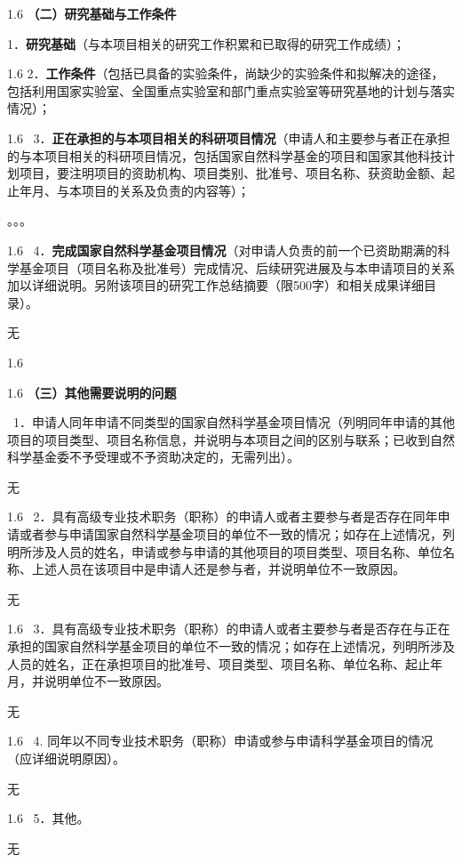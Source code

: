 \documentclass[UTF8,A4]{ctexart}
\newcommand{\blue}{\textcolor[rgb]{0.00,0.44,0.75}}
\begin{document}
\pagebreak[4]
\begin{spacing}{1.6}
\kaishu
\blue{\textbf{（二）研究基础与工作条件}}

\blue{1．\textbf{研究基础}（与本项目相关的研究工作积累和已取得的研究工作成绩）；}
\end{spacing}

\begin{spacing}{1.6}
\kaishu
\blue{2．\textbf{工作条件}（包括已具备的实验条件，尚缺少的实验条件和拟解决的途径，包括利用国家实验室、全国重点实验室和部门重点实验室等研究基地的计划与落实情况）；}
\end{spacing}


\pagebreak[4]
\begin{spacing}{1.6}
\kaishu
\blue{~3．\textbf{正在承担的与本项目相关的科研项目情况}（申请人和主要参与者正在承担的与本项目相关的科研项目情况，包括国家自然科学基金的项目和国家其他科技计划项目，要注明项目的资助机构、项目类别、批准号、项目名称、获资助金额、起止年月、与本项目的关系及负责的内容等）；}
\end{spacing}
。。。

\begin{spacing}{1.6}
\kaishu
\blue{~4．\textbf{完成国家自然科学基金项目情况}（对申请人负责的前一个已资助期满的科学基金项目（项目名称及批准号）完成情况、后续研究进展及与本申请项目的关系加以详细说明。另附该项目的研究工作总结摘要（限500字）和相关成果详细目录）。}
\end{spacing}
无

\begin{spacing}{1.6}
\kaishu

\end{spacing}
\pagebreak[4]
\begin{spacing}{1.6}
\kaishu
\blue{\textbf{（三）其他需要说明的问题}}

\blue{~1．申请人同年申请不同类型的国家自然科学基金项目情况（列明同年申请的其他项目的项目类型、项目名称信息，并说明与本项目之间的区别与联系；已收到自然科学基金委不予受理或不予资助决定的，无需列出）。}
\end{spacing}
无

\begin{spacing}{1.6}
\kaishu
\blue{~2．具有高级专业技术职务（职称）的申请人或者主要参与者是否存在同年申请或者参与申请国家自然科学基金项目的单位不一致的情况；如存在上述情况，列明所涉及人员的姓名，申请或参与申请的其他项目的项目类型、项目名称、单位名称、上述人员在该项目中是申请人还是参与者，并说明单位不一致原因。}
\end{spacing}
无
\begin{spacing}{1.6}
\kaishu
\blue{~3．具有高级专业技术职务（职称）的申请人或者主要参与者是否存在与正在承担的国家自然科学基金项目的单位不一致的情况；如存在上述情况，列明所涉及人员的姓名，正在承担项目的批准号、项目类型、项目名称、单位名称、起止年月，并说明单位不一致原因。}
\end{spacing}
无

\begin{spacing}{1.6}
\kaishu
\blue{~4. 同年以不同专业技术职务（职称）申请或参与申请科学基金项目的情况（应详细说明原因）。}
\end{spacing}
无


\begin{spacing}{1.6}
\kaishu
\blue{~5．其他。}
\end{spacing}
无
\end{document}
